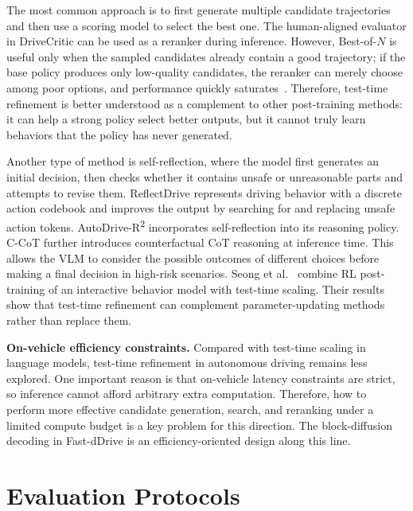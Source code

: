 \documentclass[runningheads]{llncs}
\begin{document}
The most common approach is to first generate multiple candidate trajectories and then use a scoring model to select the best one. The human-aligned evaluator in DriveCritic \cite{drivecritic2025} can be used as a reranker during inference. However, Best-of-$N$ is useful only when the sampled candidates already contain a good trajectory; if the base policy produces only low-quality candidates, the reranker can merely choose among poor options, and performance quickly saturates~\cite{dial2026}. Therefore, test-time refinement is better understood as a complement to other post-training methods: it can help a strong policy select better outputs, but it cannot truly learn behaviors that the policy has never generated.


Another type of method is self-reflection, where the model first generates an initial decision, then checks whether it contains unsafe or unreasonable parts and attempts to revise them. ReflectDrive \cite{reflectdrive2025} represents driving behavior with a discrete action codebook and improves the output by searching for and replacing unsafe action tokens. AutoDrive-R\textsuperscript{2} \cite{autodriver2_2025} incorporates self-reflection into its reasoning policy. C-CoT \cite{ccot2026} further introduces counterfactual CoT reasoning at inference time. This allows the VLM to consider the possible outcomes of different choices before making a final decision in high-risk scenarios. Seong et al.~\cite{grbo2025} combine RL post-training of an interactive behavior model with test-time scaling. Their results show that test-time refinement can complement parameter-updating methods rather than replace them.

\textbf{On-vehicle efficiency constraints.} Compared with test-time scaling in language models, test-time refinement in autonomous driving remains less explored. One important reason is that on-vehicle latency constraints are strict, so inference cannot afford arbitrary extra computation. Therefore, how to perform more effective candidate generation, search, and reranking under a limited compute budget is a key problem for this direction. The block-diffusion decoding in Fast-dDrive \cite{fastddrive2026} is an efficiency-oriented design along this line.



\section{Evaluation Protocols}
\label{sec:evaluation}
\end{document}
